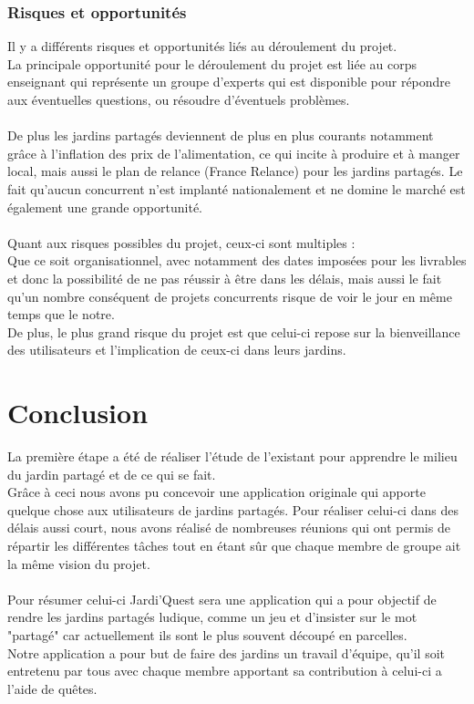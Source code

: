 \documentclass{report}
\begin{document}
\subsection*{Risques et opportunités}
Il y a différents risques et opportunités liés au déroulement du projet. \\ 
La principale opportunité pour le déroulement du projet est liée au corps enseignant qui représente un groupe d'experts qui est disponible pour répondre aux éventuelles questions, ou résoudre d'éventuels problèmes. \\ \\ 
De plus les jardins partagés deviennent de plus en plus courants notamment grâce à l'inflation des prix de l’alimentation, ce qui incite à produire et à manger local, mais aussi le plan de relance (France Relance) pour les jardins partagés. Le fait qu'aucun concurrent n'est implanté nationalement et ne domine le marché est également une grande opportunité. \\  \\ 
Quant aux risques possibles du projet, ceux-ci sont multiples :  \\ 
Que ce soit organisationnel, avec notamment des dates imposées pour les livrables et donc la possibilité de ne pas réussir à être dans les délais, mais aussi le fait qu'un nombre conséquent de projets concurrents risque de voir le jour en même temps que le notre. \\ 
De plus, le plus grand risque du projet est que celui-ci repose sur la bienveillance des utilisateurs et l'implication de ceux-ci dans leurs jardins.




\chapter*{Conclusion}
La première étape a été de réaliser l'étude de l'existant pour apprendre le milieu du jardin partagé et de ce qui se fait. \\ 
Grâce à ceci nous avons pu concevoir une application originale qui apporte quelque chose aux utilisateurs de jardins partagés. Pour réaliser celui-ci dans des délais aussi court, nous avons réalisé de nombreuses réunions qui ont permis de répartir les différentes tâches tout en étant sûr que chaque membre de groupe ait la même vision du projet. \\ \\ 
Pour résumer celui-ci Jardi'Quest sera une application qui a pour objectif de rendre les jardins partagés ludique, comme un jeu et d'insister sur le mot "partagé" car actuellement ils sont le plus souvent découpé en parcelles. \\ 
Notre application a pour but de faire des jardins un travail d'équipe, qu'il soit entretenu par tous avec chaque membre apportant sa contribution à celui-ci a l'aide de quêtes.
\end{document}
